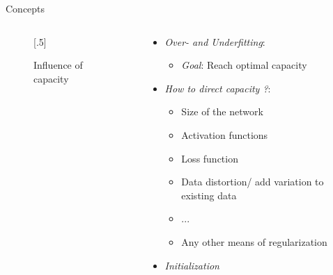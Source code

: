 \documentclass[usenames,dvipsnames,Nike,mathserif]{tuberlinbeamer}
\begin{document}
\begin{frame}[fragile]{Concepts}
	\begin{columns}
		\begin{column}{.5\textwidth}
			\begin{figure}
				\scalebox{.5}[.5]{}
				\caption{Influence of capacity}
			\end{figure}
		\end{column}
		\begin{column}{.5\textwidth}
			\begin{itemize}
				\item \emph{Over- and Underfitting}:
					\begin{itemize}
						\item<2->\emph{Goal}: Reach optimal capacity
					\end{itemize}
				\item<3->\emph{How to direct capacity ?}:
				\begin{itemize}
					\item<4-> Size of the network
					\item<5-> Activation functions
					\item<6-> Loss function
					\item<7-> Data distortion/ add variation to existing data
					\item<8-> ...
					\item<8-> Any other means of regularization
				\end{itemize}
				\item<9->\emph{Initialization}
			\end{itemize}
		\end{column}
	\end{columns}
\end{frame}
\end{document}
